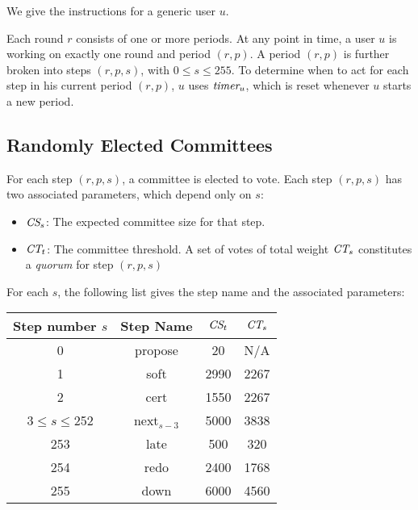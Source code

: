 \documentclass[../main.tex]{subfiles}
\begin{document}
We give the instructions for a generic user $u$.

Each round $r$ consists of one or more periods. 
At any point in time, a user $u$ is working on exactly one round and period $(r,p)$.  
A period $(r,p)$ is further broken into steps $(r,p,s)$, with $0\leq s \leq 255$. 
To determine when to act for each step in his current period $(r,p)$, $u$ uses $\textit{timer}_u$, 
which is reset whenever $u$ starts a new period.

\subsection{Randomly Elected Committees}

For each step $(r,p,s)$, a committee is elected to vote. Each step $(r,p,s)$ has two associated parameters, which depend only on $s$:
\begin{itemize}
    \item $\textit{\textit{CS}}_s$: The expected committee size for that step.
    \item $\textit{\textit{CT}}_t$: The committee threshold. A set of votes of total weight $\textit{\textit{CT}}_s$ constitutes a \textit{quorum} for step $(r,p,s)$
\end{itemize}
For each $s$, the following list gives the step name and the associated parameters:

\begin{center}
\begin{tabular}{ |c|c|c|c| } 
 \hline
 Step number $s$ & Step Name & $\textit{CS}_t$ & $\textit{CT}_s$ \\
 \hline
 0 & propose & 20 & N/A \\ 
 1 & soft & 2990 & 2267 \\ 
 2 & cert & 1550 & 2267 \\ 
 3$\leq s \leq$252 & next$_{s-3}$ & 5000 & 3838 \\ 
 253 & late & 500 & 320 \\ 
 254 & redo & 2400 & 1768 \\ 
 255 & down & 6000 & 4560 \\ 
 \hline
\end{tabular}
\end{center}
\end{document}
